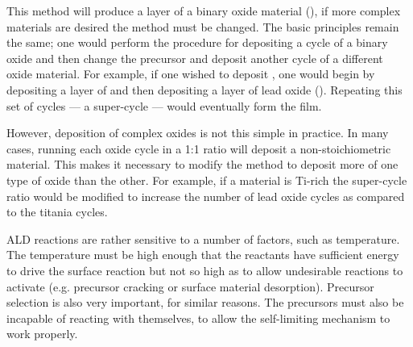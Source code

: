 This method will produce a layer of a binary oxide material (), if more complex materials are desired the method must be changed. The basic principles remain the same; one would perform the procedure for depositing a cycle of a binary oxide and then change the precursor and deposit another cycle of a different oxide material. For example, if one wished to deposit \PTO{}, one would begin by depositing a layer of  and then depositing a layer of lead oxide (). Repeating this set of cycles --- a super-cycle --- would eventually form the \PTO{} film. 

However, deposition of complex oxides is not this simple in practice. In many cases, running each oxide cycle in a 1:1 ratio will deposit a non-stoichiometric material. This makes it necessary to modify the method to deposit more of one type of oxide than the other. For example, if a material is Ti-rich the super-cycle ratio would be modified to increase the number of lead oxide cycles as compared to the titania cycles. 

ALD reactions are rather sensitive to a number of factors, such as temperature. The temperature must be high enough that the reactants have sufficient energy to drive the surface reaction but not so high as to allow undesirable reactions to activate (e.g. precursor cracking or surface material desorption). Precursor selection is also very important, for similar reasons. The precursors must also be incapable of reacting with themselves, to allow the self-limiting mechanism to work properly. 


%
%



\lipsum







